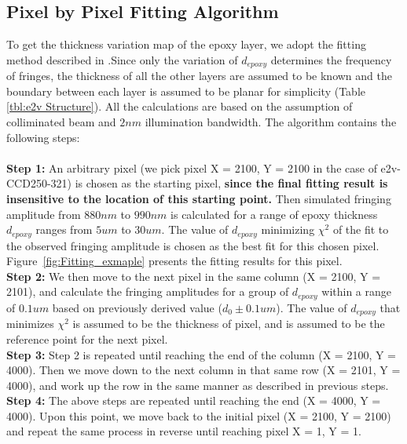 \documentclass[twocolumn]{aastex63} %
\begin{document}
\begin{CJK*}{UTF8}{gbsn}
\subsection{Pixel by Pixel Fitting Algorithm}
To get the thickness variation map of the epoxy layer, we adopt the fitting method described in \citet{Malumuth03}.Since only the variation of $d_{epoxy}$ determines the frequency of fringes, the thickness of all the other layers are assumed to be known and the boundary between each layer is assumed to be planar for simplicity (Table \ref{tbl:e2v Structure}). All the calculations are based on the assumption of colliminated beam and $2nm$ illumination bandwidth.
The algorithm contains the following steps: \\ \\
\textbf{Step 1:} An arbitrary pixel (we pick pixel X = 2100, Y = 2100 in the case of e2v-CCD250-321) is chosen as the starting pixel, \textbf{since the final fitting result is insensitive to the location of this starting point.} Then simulated fringing amplitude from $880nm$ to $990nm$ is calculated for a range of epoxy thickness $d_{epoxy}$ ranges from $5um$ to $30um$. The value of $d_{epoxy}$ minimizing $\chi^2$ of the fit to the observed fringing amplitude is chosen as the best fit for this chosen pixel.  Figure~\ref{fig:Fitting_exmaple} presents the fitting results for this pixel.\\
\textbf{Step 2:} We then move to the next pixel in the same column (X = 2100, Y = 2101), and calculate the fringing amplitudes for a group of $d_{epoxy}$ within a range of $0.1um$ based on previously derived value ($d_{0} \pm 0.1um$). The value of $d_{epoxy}$ that minimizes $\chi^2$ is assumed to be the thickness of pixel, and is assumed to be the reference point for the next pixel.\\
\textbf{Step 3:} Step 2 is repeated until reaching the end of the column (X = 2100, Y = 4000). Then we move down to the next column in that same row (X = 2101, Y = 4000), and work up the row in the same manner as described in previous steps. \\
\textbf{Step 4:} The above steps are repeated until reaching the end (X = 4000, Y = 4000). Upon this point, we move back to the initial pixel (X = 2100, Y = 2100) and repeat the same process in reverse until reaching pixel X = 1, Y = 1. 



\end{CJK*}
\end{document}
